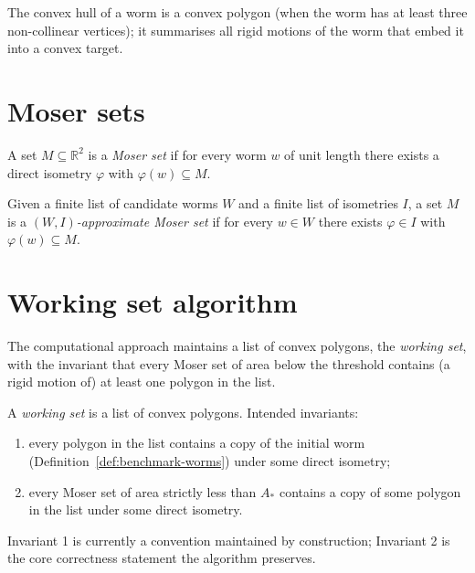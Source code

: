\begin{definition}
  \label{def:worm-hull}
  The convex hull of a worm is a convex polygon (when the worm has at
  least three non-collinear vertices); it summarises all rigid motions of
  the worm that embed it into a convex target.
\end{definition}

\chapter{Moser sets}

\begin{definition}
  \label{def:moser-set}
  A set $M \subseteq \mathbb{R}^2$ is a \emph{Moser set} if for every
  worm $w$ of unit length there exists a direct isometry $\varphi$ with
  $\varphi(w) \subseteq M$.
\end{definition}

\begin{definition}
  \label{def:approx-moser-set}
  Given a finite list of candidate worms $W$ and a finite list of
  isometries $I$, a set $M$ is a \emph{$(W, I)$-approximate Moser set} if
  for every $w \in W$ there exists $\varphi \in I$ with
  $\varphi(w) \subseteq M$.
\end{definition}

\chapter{Working set algorithm}

The computational approach maintains a list of convex polygons, the
\emph{working set}, with the invariant that every Moser set of area
below the threshold contains (a rigid motion of) at least one polygon in
the list.

\begin{definition}
  \label{def:workingSet}
  \leanok
  A \emph{working set} is a list of convex polygons. Intended invariants:
  \begin{enumerate}
    \item every polygon in the list contains a copy of the initial worm
      (Definition~\ref{def:benchmark-worms}) under some direct isometry;
    \item every Moser set of area strictly less than $A_*$ contains a
      copy of some polygon in the list under some direct isometry.
  \end{enumerate}
  Invariant 1 is currently a convention maintained by construction;
  Invariant 2 is the core correctness statement the algorithm preserves.
\end{definition}

